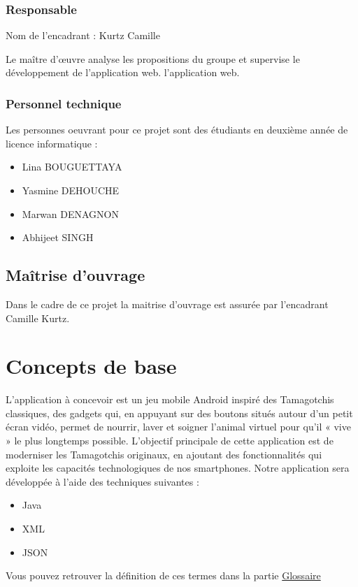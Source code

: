 \documentclass{rapportECL}
\begin{document}
\subsubsection{Responsable}
Nom de l'encadrant : Kurtz Camille 

Le maître d’œuvre analyse les propositions du groupe et supervise le développement de l'application web.
l'application web.
\subsubsection{Personnel technique}
Les personnes oeuvrant pour ce projet sont des étudiants en deuxième année de licence informatique :
\begin{itemize}[label=\textbullet]
\item Lina BOUGUETTAYA 
\item Yasmine DEHOUCHE
\item Marwan DENAGNON 
\item Abhijeet SINGH
\end{itemize}
\subsection{Maîtrise d'ouvrage}
Dans le cadre de ce projet la maitrise d’ouvrage est assurée par l’encadrant Camille Kurtz.
\section{Concepts de base}
L’application à concevoir est un jeu mobile Android inspiré des Tamagotchis classiques, des gadgets qui, en appuyant sur des boutons situés autour d'un petit écran vidéo, permet de nourrir, laver et soigner l'animal virtuel pour qu'il « vive » le plus longtemps possible. L’objectif principale de cette application est de moderniser les Tamagotchis originaux, en ajoutant des fonctionnalités qui exploite les capacités technologiques de nos smartphones. Notre application sera développée à l’aide des techniques suivantes :
\begin{itemize}[label=\textbullet]
\item Java
\item XML
\item JSON
\end{itemize}
Vous pouvez retrouver la définition de ces termes dans la partie \protect\hyperref[sec:glossaire]{Glossaire}
\end{document}
